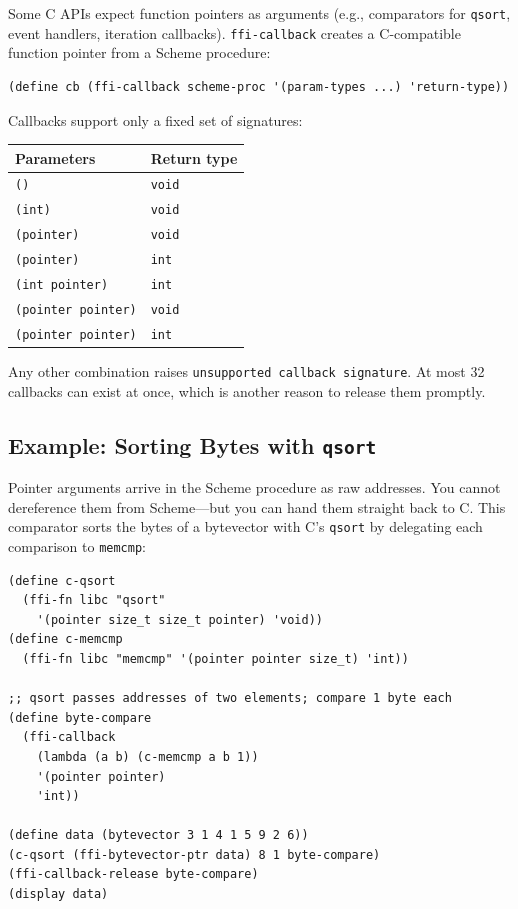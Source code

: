 Some C APIs expect function pointers as arguments (e.g., comparators for \texttt{qsort}, event handlers, iteration callbacks). \texttt{ffi-callback} creates a C-compatible function pointer from a Scheme procedure:

\begin{lstlisting}
(define cb (ffi-callback scheme-proc '(param-types ...) 'return-type))
\end{lstlisting}

Callbacks support only a fixed set of signatures:

\begin{center}
\begin{tabular}{ll}
\textbf{Parameters} & \textbf{Return type} \\
\hline
\texttt{()} & \texttt{void} \\
\texttt{(int)} & \texttt{void} \\
\texttt{(pointer)} & \texttt{void} \\
\texttt{(pointer)} & \texttt{int} \\
\texttt{(int pointer)} & \texttt{int} \\
\texttt{(pointer pointer)} & \texttt{void} \\
\texttt{(pointer pointer)} & \texttt{int} \\
\end{tabular}
\end{center}

Any other combination raises \texttt{unsupported callback signature}. At most 32 callbacks can exist at once, which is another reason to release them promptly.

\subsection{Example: Sorting Bytes with \texttt{qsort}}

Pointer arguments arrive in the Scheme procedure as raw addresses. You cannot dereference them from Scheme---but you can hand them straight back to C. This comparator sorts the bytes of a bytevector with C's \texttt{qsort} by delegating each comparison to \texttt{memcmp}:

\begin{lstlisting}
(define c-qsort
  (ffi-fn libc "qsort"
    '(pointer size_t size_t pointer) 'void))
(define c-memcmp
  (ffi-fn libc "memcmp" '(pointer pointer size_t) 'int))

;; qsort passes addresses of two elements; compare 1 byte each
(define byte-compare
  (ffi-callback
    (lambda (a b) (c-memcmp a b 1))
    '(pointer pointer)
    'int))

(define data (bytevector 3 1 4 1 5 9 2 6))
(c-qsort (ffi-bytevector-ptr data) 8 1 byte-compare)
(ffi-callback-release byte-compare)
(display data)
\end{lstlisting}

